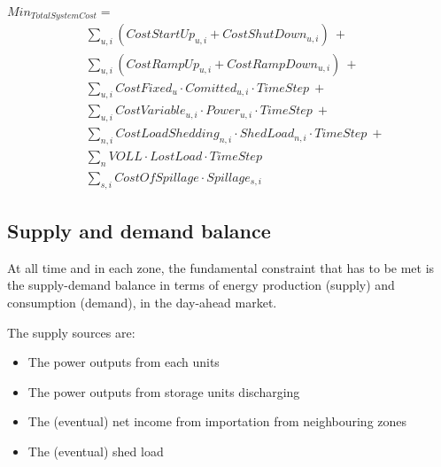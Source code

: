 \begin{captionnable}[h]
    $Min_{TotalSystemCost}=$
    \begin{equation}
        \begin{split}
            & \sum_{u,i} (CostStartUp_{u,i} + CostShutDown_{u,i}) \:+ \\
            & \sum_{u,i} (CostRampUp_{u,i} + CostRampDown_{u,i}) \:+ \\
            & \sum_{u,i} CostFixed_{u}\cdot Comitted_{u,i} \cdot TimeStep\:+ \\
            & \sum_{u,i} CostVariable_{u,i} \cdot Power_{u,i} \cdot TimeStep\:+ \\
            & \sum_{n,i} CostLoadShedding_{n,i}\cdot ShedLoad_{n,i} \cdot TimeStep \:+ \\
            & \sum_{n} VOLL \cdot LostLoad \cdot TimeStep \\
            & \sum_{s,i}CostOfSpillage \cdot Spillage_{s,i}
        \end{split}
        \label{obj-function-sum}
    \end{equation}
\end{captionnable}

\subsection{Supply and demand balance}

At all time and in each zone, the fundamental constraint that has to be met is the supply-demand balance in terms of energy production (supply) and consumption (demand), in the day-ahead market.

The supply sources are:
\begin{itemize}
    \item The power outputs from each units 
    \item The power outputs from storage units discharging
    \item The (eventual) net income from importation from neighbouring zones
    \item The (eventual) shed load
\end{itemize}

